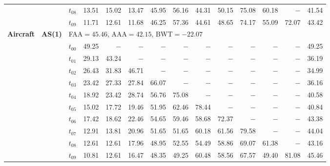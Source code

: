 \begin{table}[ht]
\begin{tabular}{@{}l l l *{11}{r}@{}}
 & & $t_{08}$ & 13.51 & 15.02 & 13.47 & 45.95 & 56.16 & 44.31 & 50.15 & 75.08 & 60.18 & $-$ & 41.54 \\
 & & $t_{09}$ & 11.71 & 12.61 & 11.68 & 46.25 & 57.36 & 44.61 & 48.65 & 74.17 & 55.09 & 72.07 & 43.42 \\
\midrule
\multirow{11}{*}{\textbf{Aircraft}} & \multirow{11}{*}{\textbf{AS(1)}} & \multicolumn{12}{l}{\quad\small FAA$=45.46$,\; AAA$=42.15$,\; BWT$=-22.07$} \\
 & & $t_{00}$ & 49.25 & $-$ & $-$ & $-$ & $-$ & $-$ & $-$ & $-$ & $-$ & $-$ & 49.25 \\
 & & $t_{01}$ & 29.13 & 43.24 & $-$ & $-$ & $-$ & $-$ & $-$ & $-$ & $-$ & $-$ & 36.19 \\
 & & $t_{02}$ & 26.43 & 31.83 & 46.71 & $-$ & $-$ & $-$ & $-$ & $-$ & $-$ & $-$ & 34.99 \\
 & & $t_{03}$ & 23.42 & 27.33 & 27.84 & 66.07 & $-$ & $-$ & $-$ & $-$ & $-$ & $-$ & 36.16 \\
 & & $t_{04}$ & 18.92 & 23.42 & 28.74 & 56.76 & 75.08 & $-$ & $-$ & $-$ & $-$ & $-$ & 40.58 \\
 & & $t_{05}$ & 15.02 & 17.72 & 19.46 & 51.95 & 62.46 & 78.44 & $-$ & $-$ & $-$ & $-$ & 40.84 \\
 & & $t_{06}$ & 17.42 & 18.62 & 22.46 & 54.65 & 59.46 & 58.68 & 72.37 & $-$ & $-$ & $-$ & 43.38 \\
 & & $t_{07}$ & 12.91 & 13.81 & 20.96 & 51.65 & 51.65 & 60.18 & 61.56 & 79.58 & $-$ & $-$ & 44.04 \\
 & & $t_{08}$ & 12.61 & 12.61 & 17.96 & 48.95 & 52.55 & 54.49 & 58.86 & 69.07 & 61.38 & $-$ & 43.16 \\
 & & $t_{09}$ & 10.81 & 12.61 & 16.47 & 48.35 & 49.25 & 60.48 & 58.56 & 67.57 & 49.40 & 81.08 & 45.46 \\
\bottomrule
\end{tabular}
\end{table}

